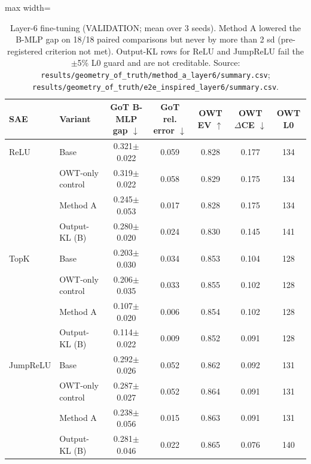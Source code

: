 \begin{table}[t]
\centering
\small
\caption{Layer-6 fine-tuning (VALIDATION; mean over 3 seeds). Method A lowered the B-MLP gap on 18/18 paired comparisons but never by more than 2 sd (pre-registered criterion not met). Output-KL rows for ReLU and JumpReLU fail the $\pm$5\% L0 guard and are not creditable. Source: \texttt{results/\allowbreak{}geometry\_of\_truth/\allowbreak{}method\_a\_layer6/\allowbreak{}summary.csv}; \texttt{results/\allowbreak{}geometry\_of\_truth/\allowbreak{}e2e\_inspired\_layer6/\allowbreak{}summary.csv}.}
\label{tab:ft6}
\begin{adjustbox}{max width=\linewidth}
\begin{tabular}{llccccc}
\toprule
SAE & Variant & GoT B-MLP gap $\downarrow$ & GoT rel. error $\downarrow$ & OWT EV $\uparrow$ & OWT $\Delta$CE $\downarrow$ & OWT L0 \\
\midrule
ReLU & Base & 0.321$\pm$0.022 & 0.059 & 0.828 & 0.177 & 134 \\
 & OWT-only control & 0.319$\pm$0.022 & 0.058 & 0.829 & 0.175 & 134 \\
 & Method A & 0.245$\pm$0.053 & 0.017 & 0.828 & 0.175 & 134 \\
 & Output-KL (B) & 0.280$\pm$0.020 & 0.024 & 0.830 & 0.145 & 141 \\
\midrule
TopK & Base & 0.203$\pm$0.030 & 0.034 & 0.853 & 0.104 & 128 \\
 & OWT-only control & 0.206$\pm$0.035 & 0.033 & 0.855 & 0.102 & 128 \\
 & Method A & 0.107$\pm$0.020 & 0.006 & 0.854 & 0.102 & 128 \\
 & Output-KL (B) & 0.114$\pm$0.022 & 0.009 & 0.852 & 0.091 & 128 \\
\midrule
JumpReLU & Base & 0.292$\pm$0.026 & 0.052 & 0.862 & 0.092 & 131 \\
 & OWT-only control & 0.287$\pm$0.027 & 0.052 & 0.864 & 0.091 & 131 \\
 & Method A & 0.238$\pm$0.056 & 0.015 & 0.863 & 0.091 & 131 \\
 & Output-KL (B) & 0.281$\pm$0.046 & 0.022 & 0.865 & 0.076 & 140 \\
\bottomrule
\end{tabular}
\end{adjustbox}
\end{table}
